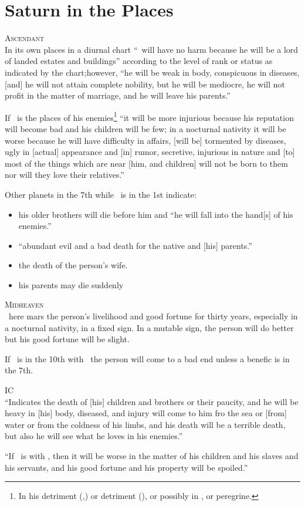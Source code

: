 \section{Saturn in the Places}
\textsc{Ascendant} \hfill \\
\indent In its own places in a diurnal chart ``\Saturn\, will have no harm because he will be a lord of landed estates and buildings'' according to the level of rank or status as indicated by the chart;however, ``he will be weak in body, conspicuous in diseases, [and] he will not attain complete nobility, but he will be mediocre, he will not profit in the matter of marriage, and he will leave his parents.''

If \Saturn\, is the places of his enemies\footnote{In his detriment (\Cancer,\Leo) or detriment (\Aries), or possibly in \Scorpio, or peregrine.} ``it will be more injurious because his reputation will become bad and his children will be few; in a nocturnal nativity it will be worse because he will have difficulty in affairs, [will be] tormented by diseases, ugly in [actual] appearance and [in] rumor, secretive, injurious in nature and [to] most of the things which are near [him, and children] will not be born to them nor will they love their relatives.''

Other planets in the 7th while \Saturn\, is in the 1st indicate:
\begin{itemize}[topsep=0em,itemsep=0em]
\item[\Jupiter] his older brothers will die before him and ``he will fall into the hand[s] of his enemies.''

\item[\Mars] ``abundant evil and a bad death for the native and [his] parents.''

\item[\Venus] the death of the person's wife.

\item[\Mercury] his parents may die suddenly
\end{itemize}

\noindent\textsc{Midheaven} \hfill \\
\indent\Saturn\, here mars the person's livelihood and good fortune for thirty years, especially in a nocturnal nativity, in a fixed sign. In a mutable sign, the person will do better but his good fortune will be slight. 

If \Saturn\, is in the 10th with \Mars\, the person will come to a bad end unless a benefic is in the 7th.

\vspace{0.5em}
\noindent\textsc{IC} \hfill \\
\indent ``Indicates the death of [his] children and brothers or their paucity, and he will be heavy in [his] body, diseased, and injury will come to him fro the sea or [from] water or from the coldness of his limbs, and his death will be a terrible death, but also he will see what he loves in his enemies.''

``If \Mercury\, is with \Saturn, then it will be worse in the matter of his children and his slaves and his servants, and his good fortune and his property will be spoiled.''
